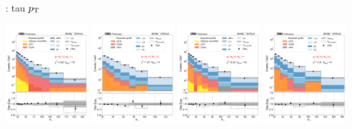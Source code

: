 \begin{frame}{}
\begin{tcolorbox}[colframe=NUpurple]{ \cmt: tau $p_{\mathrm{T}}$}
\begin{center}
            \includegraphics[width=0.24\textwidth]{chapters/Analysis/sectionStatisticalAnalysis/figures/fit/mutau_cat_eq2_eq1}
            \includegraphics[width=0.24\textwidth]{chapters/Analysis/sectionStatisticalAnalysis/figures/fit/mutau_cat_eq2_eq2}
            \includegraphics[width=0.24\textwidth]{chapters/Analysis/sectionStatisticalAnalysis/figures/fit/mutau_cat_gt3_eq1}
            \includegraphics[width=0.24\textwidth]{chapters/Analysis/sectionStatisticalAnalysis/figures/fit/mutau_cat_gt3_gt2}
        \end{center}
    \end{tcolorbox}

\end{frame}
